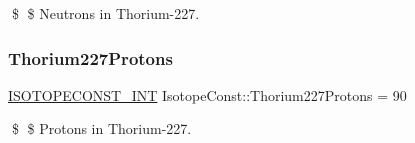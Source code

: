 \$ \$ Neutrons in Thorium-\/227. \mbox{\label{group___isotope_const-_thorium-_th227_ga8ecfc1b5889a275a27b43cdfae209718}} 
\subsubsection{\texorpdfstring{Thorium227\+Protons}{Thorium227Protons}}
{\footnotesize\ttfamily \mbox{\hyperlink{group___isotope_const-_macros_ga5f18360b3e99483a35c32d789e62621c}{I\+S\+O\+T\+O\+P\+E\+C\+O\+N\+S\+T\+\_\+\+I\+NT}} Isotope\+Const\+::\+Thorium227\+Protons = 90}

\$ \$ Protons in Thorium-\/227. 
